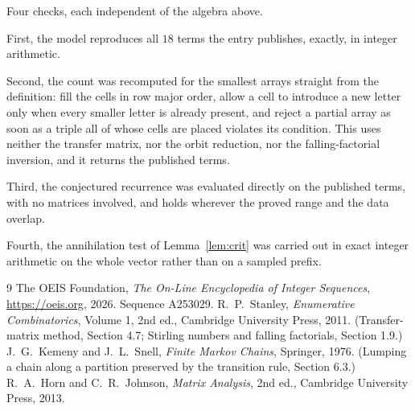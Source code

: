 \documentclass[11pt,a4paper]{article}
\theoremstyle{plain}
\theoremstyle{definition}
\begin{document}
Four checks, each independent of the algebra above.

First, the model reproduces all $18$ terms the entry publishes, exactly, in integer
arithmetic.

Second, the count was recomputed for the smallest arrays straight from the definition: fill the
cells in row major order, allow a cell to introduce a new letter only when every smaller letter
is already present, and reject a partial array as soon as a triple all of whose cells are
placed violates its condition. This uses neither the transfer matrix, nor the orbit reduction,
nor the falling-factorial inversion, and it returns the published terms.

Third, the conjectured recurrence was evaluated directly on the published terms, with no
matrices involved, and holds wherever the proved range and the data overlap.

Fourth, the annihilation test of Lemma~\ref{lem:crit} was carried out in exact integer
arithmetic on the whole vector rather than on a sampled prefix.

\begin{thebibliography}{9}
 The OEIS Foundation, \emph{The On-Line Encyclopedia of Integer
Sequences}, \url{https://oeis.org}, 2026. Sequence A253029.
 R.~P.~Stanley, \emph{Enumerative Combinatorics}, Volume 1, 2nd ed.,
Cambridge University Press, 2011. (Transfer-matrix method, Section 4.7; Stirling numbers and
falling factorials, Section 1.9.)
 J.~G.~Kemeny and J.~L.~Snell, \emph{Finite Markov Chains}, Springer,
1976. (Lumping a chain along a partition preserved by the transition rule, Section 6.3.)
 R.~A.~Horn and C.~R.~Johnson, \emph{Matrix Analysis}, 2nd ed., Cambridge
University Press, 2013.
\end{thebibliography}
\end{document}

